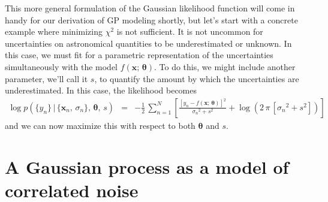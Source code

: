 \documentclass[modern, letterpaper]{aastex61}
\newcommand{\eqlabel}[1]{\label{eq:#1}}
\newcommand{\bvec}[1]{{\ensuremath{\boldsymbol{#1}}}}
\begin{document}
This more general formulation of the Gaussian likelihood function will come in
handy for our derivation of GP modeling shortly, but let's start with a
concrete example where minimizing $\chi^2$ is not sufficient.
It is not uncommon for uncertainties on astronomical quantities to be
underestimated or unknown.
In this case, we must fit for a parametric representation of the uncertainties
simultaneously with the model $f(\bvec{x};\,\bvec{\theta})$.
To do this, we might include another parameter, we'll call it $s$, to quantify
the amount by which the uncertainties are underestimated.
In this case, the likelihood becomes
\begin{eqnarray}\eqlabel{jitter-loglike}
\log p(\{y_n\}\,|\,\{\bvec{x}_n,\,\sigma_n\},\,\bvec{\theta},\,s) &=&
    -\frac{1}{2}\,\sum_{n=1}^N\left[
    \frac{{[y_n-f(\bvec{x};\,\bvec{\theta})]}^2}{{\sigma_n}^2 + s^2}
    +\log {(2\,\pi\,[{\sigma_n}^2+s^2])}
    \right]
\end{eqnarray}
and we can now maximize this with respect to both $\bvec{\theta}$ and $s$.

\section{A Gaussian process as a model of correlated noise}
\end{document}
